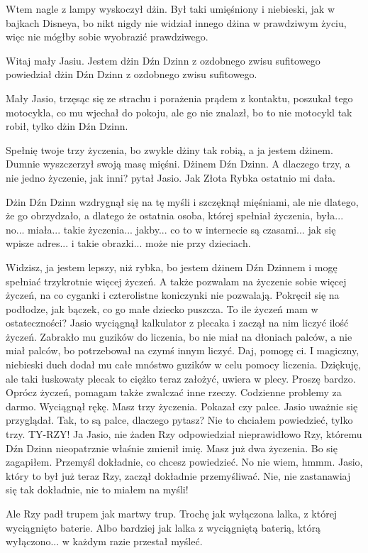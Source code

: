 Wtem nagle z lampy wyskoczył dżin. 
Był taki umięśniony i niebieski, jak w bajkach Disneya, bo nikt nigdy nie widział innego dżina w prawdziwym życiu, więc nie mógłby sobie wyobrazić prawdziwego.
\begin{dialogue}
	\ds{} Witaj mały Jasiu. Jestem dżin Dźn Dzinn z ozdobnego zwisu sufitowego \dm{} powiedział dżin Dźn Dzinn z ozdobnego zwisu sufitowego.
\end{dialogue}
	Mały Jasio, trzęsąc się ze strachu i porażenia prądem z kontaktu, poszukał tego motocykla, co mu wjechał do pokoju, ale go nie znalazł, bo to nie motocykl tak robił, tylko dżin Dźn Dzinn.
\begin{dialogue}
	\ds{} Spełnię twoje trzy życzenia, bo zwykle dżiny tak robią, a ja jestem dżinem. \dm{} Dumnie wyszczerzył swoją masę mięśni. \dm{} Dżinem Dźn Dzinn.
	\ds{} A dlaczego trzy, a nie jedno życzenie, jak inni? \dm{} pytał Jasio. \dm{} Jak Złota Rybka ostatnio mi dała.
\end{dialogue}
Dżin Dźn Dzinn wzdrygnął się na tę myśli i szczęknął mięśniami, ale nie dlatego, że go obrzydzało, a dlatego że ostatnia osoba, której spełniał życzenia, była... no... miała... takie życzenia... jakby... co to w internecie są czasami... jak się wpisze adres... i takie obrazki... może nie przy dzieciach.
\begin{dialogue}
	\ds{} Widzisz, ja jestem lepszy, niż rybka, bo jestem dżinem Dźn Dzinnem i mogę spełniać trzykrotnie więcej życzeń.
	A także pozwalam na życzenie sobie więcej życzeń, na co cyganki i czterolistne koniczynki nie pozwalają. \dm{} Pokręcił się na podłodze,
	jak bączek, co go małe dziecko puszcza.
	\ds{} To ile życzeń mam w ostateczności? \dm{} Jasio wyciągnął kalkulator z plecaka i zaczął na nim liczyć ilość życzeń. Zabrakło mu guzików do liczenia, bo nie miał na dłoniach palców, a nie miał palców, bo potrzebował na czymś innym liczyć.
	\ds{} Daj, pomogę ci. \dm{} I magiczny, niebieski duch dodał mu całe mnóstwo guzików w celu pomocy liczenia.
	\ds{} Dziękuję, ale taki łuskowaty plecak to ciężko teraz założyć, uwiera w plecy.
	\ds{} Proszę bardzo. Oprócz życzeń, pomagam także zwalczać inne rzeczy. Codzienne problemy za darmo. \dm{} Wyciągnął rękę. \dm{} Masz trzy życzenia. \dm{} Pokazał czy palce. Jasio uważnie się przyglądał.
	\ds{} Tak, to są palce, dlaczego pytasz?
	\ds{} Nie to chciałem powiedzieć, tylko trzy. TY-RZY!
	\ds{} Ja Jasio, nie żaden Rzy \dm{} odpowiedział nieprawidłowo Rzy, któremu Dźn Dzinn nieopatrznie właśnie zmienił imię.
	\ds{} Masz już dwa życzenia. Bo się zagapiłem. Przemyśl dokładnie, co chcesz powiedzieć.
	\ds{} No nie wiem, hmmm. \dm{} Jasio, który to był już teraz Rzy, zaczął dokładnie przemyśliwać.
	\ds{} Nie, nie zastanawiaj się tak dokładnie, nie to miałem na myśli!
\end{dialogue}
Ale Rzy padł trupem jak martwy trup.
Trochę jak wyłączona lalka, z której wyciągnięto baterie. 
Albo bardziej jak lalka z wyciągniętą baterią, którą wyłączono... w każdym razie przestał myśleć.

